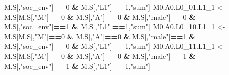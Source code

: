\documentclass[
]{book}
\newenvironment{Shaded}{\begin{snugshade}}{\end{snugshade}}
\newcommand{\DecValTok}[1]{\textcolor[rgb]{0.00,0.00,0.81}{#1}}
\newcommand{\NormalTok}[1]{#1}
\newcommand{\OtherTok}[1]{\textcolor[rgb]{0.56,0.35,0.01}{#1}}
\newcommand{\SpecialCharTok}[1]{\textcolor[rgb]{0.81,0.36,0.00}{\textbf{#1}}}
\newcommand{\StringTok}[1]{\textcolor[rgb]{0.31,0.60,0.02}{#1}}
\begin{document}
\begin{Shaded}
\begin{Highlighting}[]
\NormalTok{                            M.S[,}\StringTok{"soc\_env"}\NormalTok{]}\SpecialCharTok{==}\DecValTok{0} \SpecialCharTok{\&}\NormalTok{ M.S[,}\StringTok{"L1"}\NormalTok{]}\SpecialCharTok{==}\DecValTok{1}\NormalTok{,}\StringTok{"sum"}\NormalTok{]}
\NormalTok{  M0.A0.L0\_01.L1\_1 }\OtherTok{\textless{}{-}}\NormalTok{ M.S[M.S[,}\StringTok{"M"}\NormalTok{]}\SpecialCharTok{==}\DecValTok{0} \SpecialCharTok{\&}\NormalTok{ M.S[,}\StringTok{"A"}\NormalTok{]}\SpecialCharTok{==}\DecValTok{0} \SpecialCharTok{\&}\NormalTok{ M.S[,}\StringTok{"male"}\NormalTok{]}\SpecialCharTok{==}\DecValTok{0} \SpecialCharTok{\&} 
\NormalTok{                            M.S[,}\StringTok{"soc\_env"}\NormalTok{]}\SpecialCharTok{==}\DecValTok{1} \SpecialCharTok{\&}\NormalTok{ M.S[,}\StringTok{"L1"}\NormalTok{]}\SpecialCharTok{==}\DecValTok{1}\NormalTok{,}\StringTok{"sum"}\NormalTok{]}
\NormalTok{  M0.A0.L0\_10.L1\_1 }\OtherTok{\textless{}{-}}\NormalTok{ M.S[M.S[,}\StringTok{"M"}\NormalTok{]}\SpecialCharTok{==}\DecValTok{0} \SpecialCharTok{\&}\NormalTok{ M.S[,}\StringTok{"A"}\NormalTok{]}\SpecialCharTok{==}\DecValTok{0} \SpecialCharTok{\&}\NormalTok{ M.S[,}\StringTok{"male"}\NormalTok{]}\SpecialCharTok{==}\DecValTok{1} \SpecialCharTok{\&} 
\NormalTok{                            M.S[,}\StringTok{"soc\_env"}\NormalTok{]}\SpecialCharTok{==}\DecValTok{0} \SpecialCharTok{\&}\NormalTok{ M.S[,}\StringTok{"L1"}\NormalTok{]}\SpecialCharTok{==}\DecValTok{1}\NormalTok{,}\StringTok{"sum"}\NormalTok{]}
\NormalTok{  M0.A0.L0\_11.L1\_1 }\OtherTok{\textless{}{-}}\NormalTok{ M.S[M.S[,}\StringTok{"M"}\NormalTok{]}\SpecialCharTok{==}\DecValTok{0} \SpecialCharTok{\&}\NormalTok{ M.S[,}\StringTok{"A"}\NormalTok{]}\SpecialCharTok{==}\DecValTok{0} \SpecialCharTok{\&}\NormalTok{ M.S[,}\StringTok{"male"}\NormalTok{]}\SpecialCharTok{==}\DecValTok{1} \SpecialCharTok{\&} 
\NormalTok{                            M.S[,}\StringTok{"soc\_env"}\NormalTok{]}\SpecialCharTok{==}\DecValTok{1} \SpecialCharTok{\&}\NormalTok{ M.S[,}\StringTok{"L1"}\NormalTok{]}\SpecialCharTok{==}\DecValTok{1}\NormalTok{,}\StringTok{"sum"}\NormalTok{]}
  

\end{Highlighting}
\end{Shaded}
\end{document}
